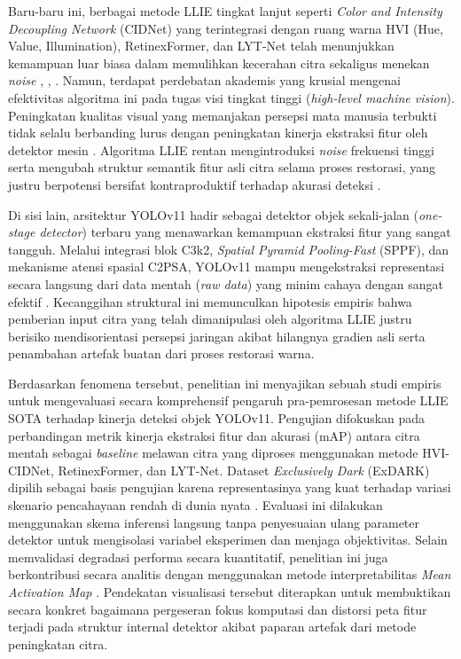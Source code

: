 \documentclass[conference]{IEEEtran}
\begin{document}
Baru-baru ini, berbagai metode LLIE tingkat lanjut seperti \textit{Color and Intensity Decoupling Network} (CIDNet) yang terintegrasi dengan ruang warna HVI (Hue, Value, Illumination), RetinexFormer, dan LYT-Net telah menunjukkan kemampuan luar biasa dalam memulihkan kecerahan citra sekaligus menekan \textit{noise} \cite{yan2025hvi}, \cite{cai2023retinexformer}, \cite{brateanu2025lytnet}. Namun, terdapat perdebatan akademis yang krusial mengenai efektivitas algoritma ini pada tugas visi tingkat tinggi (\textit{high-level machine vision}). Peningkatan kualitas visual yang memanjakan persepsi mata manusia terbukti tidak selalu berbanding lurus dengan peningkatan kinerja ekstraksi fitur oleh detektor mesin \cite{wu2024llieeffect}. Algoritma LLIE rentan mengintroduksi \textit{noise} frekuensi tinggi serta mengubah struktur semantik fitur asli citra selama proses restorasi, yang justru berpotensi bersifat kontraproduktif terhadap akurasi deteksi \cite{wang2023yolov5lowlight}.

Di sisi lain, arsitektur YOLOv11 hadir sebagai detektor objek sekali-jalan (\textit{one-stage detector}) terbaru yang menawarkan kemampuan ekstraksi fitur yang sangat tangguh. Melalui integrasi blok C3k2, \textit{Spatial Pyramid Pooling-Fast} (SPPF), dan mekanisme atensi spasial C2PSA, YOLOv11 mampu mengekstraksi representasi secara langsung dari data mentah (\textit{raw data}) yang minim cahaya dengan sangat efektif \cite{khanam2024yolov11}. Kecanggihan struktural ini memunculkan hipotesis empiris bahwa pemberian input citra yang telah dimanipulasi oleh algoritma LLIE justru berisiko mendisorientasi persepsi jaringan akibat hilangnya gradien asli serta penambahan artefak buatan dari proses restorasi warna.

Berdasarkan fenomena tersebut, penelitian ini menyajikan sebuah studi empiris untuk mengevaluasi secara komprehensif pengaruh pra-pemrosesan metode LLIE SOTA terhadap kinerja deteksi objek YOLOv11. Pengujian difokuskan pada perbandingan metrik kinerja ekstraksi fitur dan akurasi (mAP) antara citra mentah sebagai \textit{baseline} melawan citra yang diproses menggunakan metode HVI-CIDNet, RetinexFormer, dan LYT-Net. Dataset \textit{Exclusively Dark} (ExDARK) dipilih sebagai basis pengujian karena representasinya yang kuat terhadap variasi skenario pencahayaan rendah di dunia nyata \cite{loh2019exdark}. Evaluasi ini dilakukan menggunakan skema inferensi langsung tanpa penyesuaian ulang parameter detektor untuk mengisolasi variabel eksperimen dan menjaga objektivitas. Selain memvalidasi degradasi performa secara kuantitatif, penelitian ini juga berkontribusi secara analitis dengan menggunakan metode interpretabilitas \textit{Mean Activation Map} \cite{metrics2026formulas}. Pendekatan visualisasi tersebut diterapkan untuk membuktikan secara konkret bagaimana pergeseran fokus komputasi dan distorsi peta fitur terjadi pada struktur internal detektor akibat paparan artefak dari metode peningkatan citra.
\end{document}
